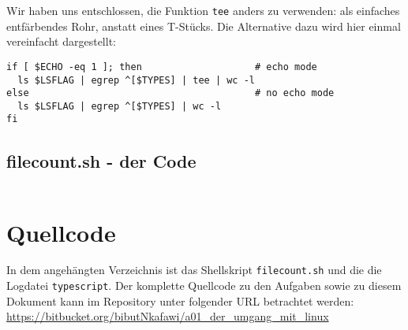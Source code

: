 \documentclass[
   draft=false
  ,paper=a4
  ,twoside=false
  ,fontsize=11pt
  ,headsepline
  ,BCOR10mm
  ,DIV11
  ,parskip=full+
]{scrartcl} %
\begin{document}
Wir haben uns entschlossen, die Funktion \texttt{tee} anders zu verwenden: als
einfaches entfärbendes Rohr, anstatt eines T-Stücks. Die Alternative dazu wird
hier einmal vereinfacht dargestellt:
\begin{verbatim}
if [ $ECHO -eq 1 ]; then                    # echo mode
  ls $LSFLAG | egrep ^[$TYPES] | tee | wc -l
else                                        # no echo mode
  ls $LSFLAG | egrep ^[$TYPES] | wc -l
fi
\end{verbatim}

\subsection{filecount.sh - der Code}
\inputminted[fontsize=\small
            ,fontfamily=tt
            ,linenos
            ,frame=single
            ]{bash}{filecount.sh}

\section{Quellcode}

In dem angehängten Verzeichnis ist das Shellskript \texttt{filecount.sh} und
die die Logdatei \texttt{typescript}.
Der komplette Quellcode zu den Aufgaben sowie zu diesem Dokument kann im
Repository unter folgender URL betrachtet werden:\newline
\url{https://bitbucket.org/bibutNkafawi/a01_der_umgang_mit_linux}
\end{document}
